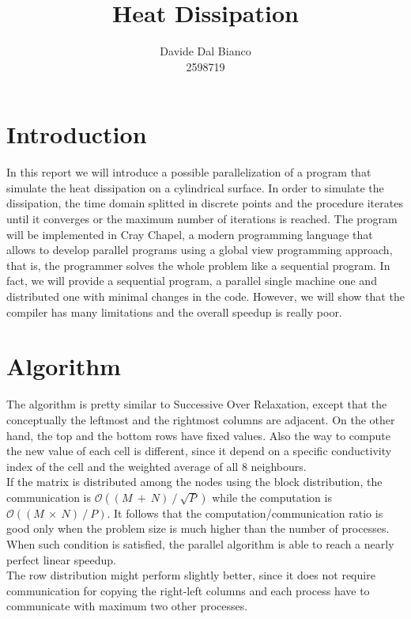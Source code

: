 \documentclass{article}
\title{Heat Dissipation}
\author{Davide Dal Bianco \\ 2598719}
\begin{document}
\maketitle

\section{Introduction} \label{sec:introduction}
In this report we will introduce a possible parallelization of a program that simulate the heat dissipation on a cylindrical surface. In order to simulate the dissipation, the time domain splitted in discrete points and the procedure iterates until it converges or the maximum number of iterations is reached. The program will be implemented in Cray Chapel, a modern programming language that allows to develop parallel programs using a global view programming approach, that is, the programmer solves the whole problem like a sequential program. In fact, we will provide a sequential program, a parallel single machine one and distributed one with minimal changes in the code. However, we will show that the compiler has many limitations and the overall speedup is really poor.

\section{Algorithm} \label{sec:algorithm}
The algorithm is pretty similar to Successive Over Relaxation, except that the conceptually the leftmost and the rightmost columns are adjacent. On the other hand, the top and the bottom rows have fixed values. Also the way to compute the new value of each cell is different, since it depend on a specific conductivity index of the cell and the weighted average of all 8 neighbours. \\
If the matrix is distributed among the nodes using the block distribution, the communication is $\mathcal{O}((M~+~N)~/~\sqrt{P})$ while the computation is $\mathcal{O}((M~\times~N)~/~P)$. It follows that the computation/communication ratio is good only when the problem size is much higher than the number of processes. When such condition is satisfied, the parallel algorithm is able to reach a nearly perfect linear speedup. \\
The row distribution might perform slightly better, since it does not require communication for copying the right-left columns and each process have to communicate with maximum two other processes.
\end{document}
